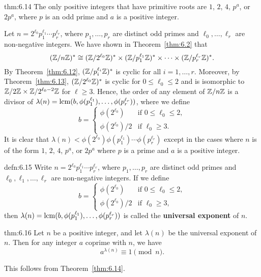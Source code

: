 \begin{theo}{thm:6.14}
    The only positive integers that have primitive roots are $1$, $2$, 
    $4$, $p^a$, or $2p^a$, where $p$ is an odd prime and $a$ is a positive integer. 
\end{theo}
\begin{pf}
    Let $n = 2^{\ell_0} p_1^{\ell_1} \cdots p_r^{\ell_r}$, where $p_1, \dots, p_r$ 
    are distinct odd primes and $\ell_0, \dots, \ell_r$ are non-negative integers. 
    We have shown in Theorem~\ref{thm:6.2} that 
    \[ (\mathbb{Z}/n\mathbb{Z})^* \cong (\mathbb{Z}/2^{\ell_0}\mathbb{Z})^* \times (\mathbb{Z}/p_1^{\ell_1}\mathbb{Z})^* 
    \times \cdots \times (\mathbb{Z}/p_r^{\ell_r}\mathbb{Z})^*. \] 
    By Theorem~\ref{thm:6.12}, $(\mathbb{Z}/p_i^{\ell_i}\mathbb{Z})^*$ is cyclic for all 
    $i = 1, \dots, r$. Moreover, by Theorem~\ref{thm:6.13}, $(\mathbb{Z}/2^{\ell_0}\mathbb{Z})^*$ 
    is cyclic for $0 \leq \ell_0 \leq 2$ and is isomorphic to 
    $\mathbb{Z}/2\mathbb{Z} \times \mathbb{Z}/2^{\ell_0-2}\mathbb{Z}$ for $\ell \geq 3$. Hence, the order 
    of any element of $\mathbb{Z}/n\mathbb{Z}$ is a divisor of 
    $\lambda(n) = \operatorname{lcm}(b, \phi(p_1^{\ell_1}), \dots, \phi(p_r^{\ell_r}))$, 
    where we define 
    \[ b = \begin{cases} 
        \phi(2^{\ell_0}) & \text{if } 0 \leq \ell_0 \leq 2, \\ 
        \phi(2^{\ell_0})/2 & \text{if } \ell_0 \geq 3.
    \end{cases} \] 
    It is clear that $\lambda(n) < \phi(2^{\ell_0}) \phi(p_1^{\ell_1}) 
    \cdots \phi(p_r^{\ell_r})$ except in the cases where $n$ is of the form 
    $1$, $2$, $4$, $p^a$, or $2p^a$ where $p$ is a prime and $a$ is a positive 
    integer. 
\end{pf}

\begin{defn}{defn:6.15}
    Write $n = 2^{\ell_0} p_1^{\ell_1} \cdots p_r^{\ell_r}$, where 
    $p_1, \dots, p_r$ are distinct odd primes and $\ell_0, \ell_1, \dots, 
    \ell_r$ are non-negative integers. If we define 
    \[ b = \begin{cases} 
        \phi(2^{\ell_0}) & \text{if } 0 \leq \ell_0 \leq 2, \\ 
        \phi(2^{\ell_0})/2 & \text{if } \ell_0 \geq 3,
    \end{cases} \]
    then $\lambda(n) = \operatorname{lcm}(b, \phi(p_1^{\ell_1}), \dots, \phi(p_r^{\ell_r}))$ 
    is called the {\bf universal exponent} of $n$. 
\end{defn}

\begin{theo}{thm:6.16}
    Let $n$ be a positive integer, and let $\lambda(n)$ be the universal 
    exponent of $n$. Then for any integer $a$ coprime with $n$, we have 
    \[ a^{\lambda(n)} \equiv 1 \pmod n. \] 
\end{theo}
\begin{pf}
    This follows from Theorem~\ref{thm:6.14}. 
\end{pf}


